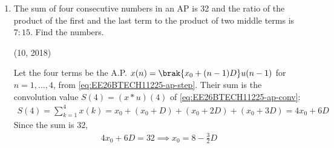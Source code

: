 \begin{enumerate}[label=\thesubsection.\arabic*, ref=\thesubsection.\theenumi]
\begin{align}
\end{align}
The Newton--Raphson iteration $x_{n+1} = x_n - \frac{x_n^2 - 39x_n - 126}{2x_n - 39}$ gives
\[
\begin{array}{c|r|r}
n & x_n\;(x_0=60) & x_n\;(x_0=-10)\\\hline
0 & 60.000000 & -10.000000 \\
1 & 46.000000 & -3.830508 \\
2 & 42.301887 & -3.014782 \\
3 & 42.001998 & -3.000005 \\
4 & 42.000000 & -3.000000
\end{array}
\]
so the roots are $42$ and $-3$, that is $f(x) = (x - 42)(x + 3)$. The speed is positive, so
\begin{align}
\boxed{\text{original speed} = 42 \text{ km/h}}
\end{align}
Check: $\frac{63}{42} + \frac{72}{48} = 1.5 + 1.5 = 3$ hours.
\begin{lstlisting}[frame=single, basicstyle=\rmfamily, escapeinside={(*@}{@*)}]
(*@\makebox[\dimexpr\linewidth-2\fboxsep-2\fboxrule\relax][c]{codes/1.2.10.c}@*)
\end{lstlisting}
\begin{lstlisting}[frame=single, basicstyle=\rmfamily, escapeinside={(*@}{@*)}]
(*@\makebox[\dimexpr\linewidth-2\fboxsep-2\fboxrule\relax][c]{codes/1.2.10.py}@*)
\end{lstlisting}
    \item The sum of four consecutive numbers in an AP is 32 and the ratio of the product of the first and the last term to the product of two middle terms is $7 : 15$. Find the numbers.
\par\hfill (10, 2018)\par
\solution
Let the four terms be the A.P. $x(n) = \brak{x_0 + (n-1)D}u(n-1)$ for $n = 1, \ldots, 4$, from \eqref{eq:EE26BTECH11225-ap-step}. Their sum is the convolution value $S(4) = (x * u)(4)$ of \eqref{eq:EE26BTECH11225-ap-conv}:
\begin{align*}
S(4) = \sum_{k=1}^{4}x(k) = x_0 + (x_0 + D) + (x_0 + 2D) + (x_0 + 3D) = 4x_0 + 6D
\end{align*}
Since the sum is $32$,
\begin{align}
4x_0 + 6D = 32 \implies x_0 = 8 - \frac{3}{2}D

\end{align}
\end{enumerate}
